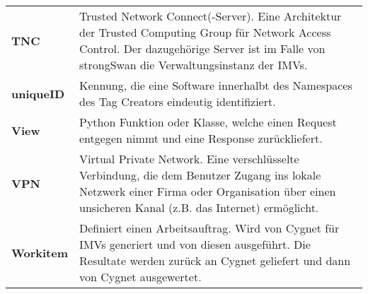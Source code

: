 {\begin{longtable}{l >{\raggedright}p{}}
\textbf{TNC} & Trusted Network Connect(-Server). Eine Architektur der Trusted Computing Group für Network Access Control. Der dazugehörige Server ist im Falle von strongSwan die Verwaltungsinstanz der IMVs.\tabularnewline
\textbf{uniqueID} & Kennung, die eine Software innerhalbt des Namespaces des Tag Creators eindeutig identifiziert.\tabularnewline
\textbf{View} & Python Funktion oder Klasse, welche einen Request entgegen nimmt und eine Response zurückliefert.\tabularnewline
\textbf{VPN} & Virtual Private Network. Eine verschlüsselte Verbindung, die dem Benutzer Zugang ins lokale Netzwerk einer Firma oder Organisation über einen unsicheren Kanal (z.B. das Internet) ermöglicht.\tabularnewline
\textbf{Workitem} & Definiert einen Arbeitsauftrag. Wird von Cygnet für IMVs generiert und von diesen ausgeführt. Die Resultate werden zurück an Cygnet geliefert und dann von Cygnet ausgewertet.
\end{longtable}
}
